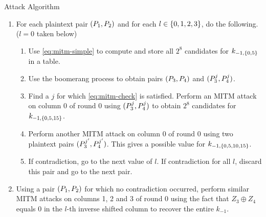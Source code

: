 \documentclass[notheorems]{beamer}
\theoremstyle{definition}
\theoremstyle{example}
\begin{document}
    \begin{frame}[<+->]{Attack Algorithm}
        \begin{enumerate}
            \conti
            \item For each plaintext pair \((P_1, P_2)\) and for each \(l
            \in \{0, 1, 2, 3\}\), do the following. (\(l = 0\) taken below)
            \begin{enumerate}[<+->]
                \item Use \eqref{eq:mitm-simple} to compute and store all
                \(2^8\) candidates for \(k_{-1, \{0, 5\}}\) in a table.
                \item Use the boomerang process to obtain pairs \((P_3,
                P_4)\) and \((P_3^j, P_4^j)\).
                \item Find a \(j\) for which \eqref{eq:mitm-check} is satisfied.
                Perform an MITM attack on column 0 of round 0 using
                \((P_3^j, P_4^j)\) to obtain \(2^8\) candidates for
                \(k_{-1, \{0, 5, 15\}}\).
                \item Perform another MITM attack on column 0 of round 0 using
                two plaintext pairs \((P_3^{j^\prime}, P_4^{j^\prime})\).
                This gives a possible value for \(k_{-1, \{0, 5, 10,
                15\}}\).
                \item If contradiction, go to the next value of \(l\). If
                contradiction for all \(l\), discard this pair and go to the
                next pair.
            \end{enumerate}
            \item Using a pair \((P_1, P_2)\) for which no contradiction
            occurred, perform similar MITM attacks on columns 1, 2 and 3 of
            round 0 using the fact that \(Z_3 \oplus Z_4\) equals 0 in the
            \(l\)-th inverse shifted column to recover the entire \(k_{-1}\). 
        \end{enumerate}
    \end{frame}
\end{document}

